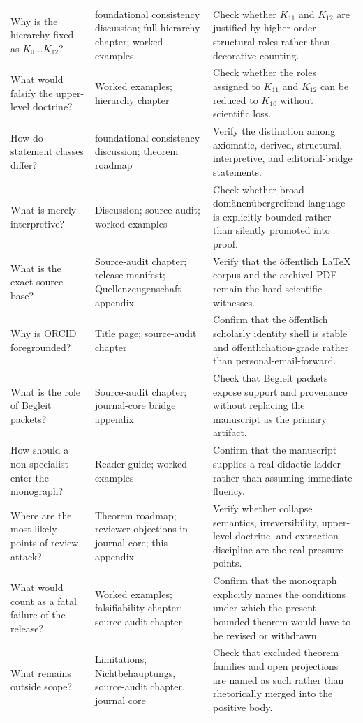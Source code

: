 \begin{longtable}{p{3.4cm} p{4.4cm} p{5.7cm}}
Why is the hierarchy fixed as \(K_0\dots K_{12}\)? & foundational consistency discussion; full hierarchy chapter; worked examples & Check whether \(K_{11}\) and \(K_{12}\) are justified by higher-order structural roles rather than decorative counting. \\
What would falsify the upper-level doctrine? & Worked examples; hierarchy chapter & Check whether the roles assigned to \(K_{11}\) and \(K_{12}\) can be reduced to \(K_{10}\) without scientific loss. \\
How do statement classes differ? & foundational consistency discussion; theorem roadmap & Verify the distinction among axiomatic, derived, structural, interpretive, and editorial-bridge statements. \\
What is merely interpretive? & Discussion; source-audit; worked examples & Check whether broad domänenübergreifend language is explicitly bounded rather than silently promoted into proof. \\
What is the exact source base? & Source-audit chapter; release manifest; Quellenzeugenschaft appendix & Verify that the öffentlich LaTeX corpus and the archival PDF remain the hard scientific witnesses. \\
Why is ORCID foregrounded? & Title page; source-audit chapter & Confirm that the öffentlich scholarly identity shell is stable and öffentlichation-grade rather than personal-email-forward. \\
What is the role of Begleit packets? & Source-audit chapter; journal-core bridge appendix & Check that Begleit packets expose support and provenance without replacing the manuscript as the primary artifact. \\
How should a non-specialist enter the monograph? & Reader guide; worked examples & Confirm that the manuscript supplies a real didactic ladder rather than assuming immediate fluency. \\
Where are the most likely points of review attack? & Theorem roadmap; reviewer objections in journal core; this appendix & Verify whether collapse semantics, irreversibility, upper-level doctrine, and extraction discipline are the real pressure points. \\
What would count as a fatal failure of the release? & Worked examples; falsifiability chapter; source-audit chapter & Confirm that the monograph explicitly names the conditions under which the present bounded theorem would have to be revised or withdrawn. \\
What remains outside scope? & Limitations, Nichtbehauptungs, source-audit chapter, journal core & Check that excluded theorem families and open projections are named as such rather than rhetorically merged into the positive body. \\
\end{longtable}

